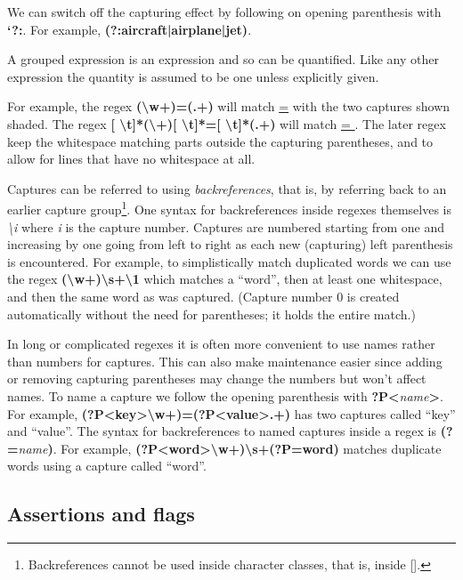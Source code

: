 We can switch off the capturing effect by following on opening parenthesis with \textbf{`?:}.
For example,
\textbf{(?:aircraft|airplane|jet)}.



A grouped expression is an expression and so can be quantified.
Like any other expression the quantity is assumed to be one unless explicitly given.

For example,
the regex \textbf{(\textbackslash w+)=(.+)} will match \underline{=} with the two captures shown shaded.
The regex \textbf{[ \textbackslash t]*(\textbackslash +)[ \textbackslash t]*=[ \textbackslash t]*(.+)} will match \underline{ = }.
The later regex keep the whitespace matching parts outside the capturing parentheses, and to allow for lines that have no whitespace at all.



Captures can be referred to using \textit{backreferences}, that is, by referring back to an earlier capture group\footnote{Backreferences cannot be used inside character classes, that is, inside [].}.
One syntax for backreferences inside regexes themselves is \textit{\textbackslash i} where \textit{i} is the capture number.
Captures are numbered starting from one and increasing by one going from left to right as each new (capturing) left parenthesis is encountered. 
For example, to simplistically match duplicated words we can use the regex \textbf{(\textbackslash w+)\textbackslash s+\textbackslash 1} which matches a ``word'', then at least one whitespace, and then the same word as was captured.
(Capture number 0 is created automatically without the need for parentheses; it holds the entire match.)



In long or complicated regexes it is often more convenient to use names rather than numbers for captures.
This can also make maintenance easier since adding or removing capturing parentheses may change the numbers but won’t affect names.
To name a capture we follow the opening parenthesis with \textbf{?P<}\textit{name}\textbf{>}.
For example, \textbf{(?P<key>\textbackslash w+)=(?P<value>.+)} has two captures called ``key'' and ``value''.
The syntax for backreferences to named captures inside a regex is \textbf{(?=}\textit{name}\textbf{)}.
For example, \textbf{(?P<word>\textbackslash w+)\textbackslash s+(?P=word)} matches duplicate words using a capture called ``word''.


\subsection{Assertions and flags}

